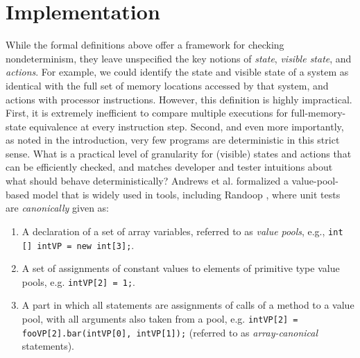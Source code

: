 \section{Implementation}

\begin{comment}
The implementation of the above ideas is conceptually straightforward,
and should be easy to apply in other automated test generation
settings with a natural notion of actions.  We present our
implementation by first sketching a mapping from the formalism to one
particular popular way to represent automatically generated unit
tests, in Section \ref{sec:pools}.  The particular implementations of
horizontal (Section \ref{sec:horizimp}) and vertical (Section
\ref{sec:vertimp}) determinism checks, as well as probabilistic
delta-debugging support (Section \ref{sec:ddimp}) are described after a general
overview of the TSTL testing tool (Section \ref{sec:tstlintro}).
\end{comment}

\label{sec:pools}

While the formal definitions above offer a framework for checking nondeterminism, they leave unspecified the key notions of \emph{state},
\emph{visible state}, and \emph{actions}.  For example, we could
identify the state and visible state of a system as identical with the
full set of memory locations accessed by that system, and actions with
processor instructions.  However, this
definition is highly impractical.  First, it is
extremely inefficient to compare multiple executions for
full-memory-state equivalence at every instruction step.  Second, and
even more importantly, as noted in the introduction, very few programs
are deterministic in this strict sense.  What is a practical level of granularity for (visible) states and actions that
can be efficiently checked, and matches developer
and tester intuitions about what should behave deterministically?
Andrews et al. formalized a value-pool-based model \cite{AndrewsTR} that is widely used in
tools, including Randoop \cite{Pacheco}, where
unit tests are \emph{canonically} given as:

\begin{enumerate}
\item A declaration of a set of array variables, referred to as
  \emph{value pools}, e.g., {\tt int [] intVP = new int[3];}.
  \item A set of assignments of constant values to elements of
    primitive type value pools, e.g. {\tt intVP[2] = 1;}.
    \item A part in which all statements are assignments of calls of a
      method to a value pool, with all arguments also
      taken from a pool, e.g. {\tt intVP[2] = fooVP[2].bar(intVP[0],
        intVP[1]);} (referred to as \emph{array-canonical} statements).
    \end{enumerate}

